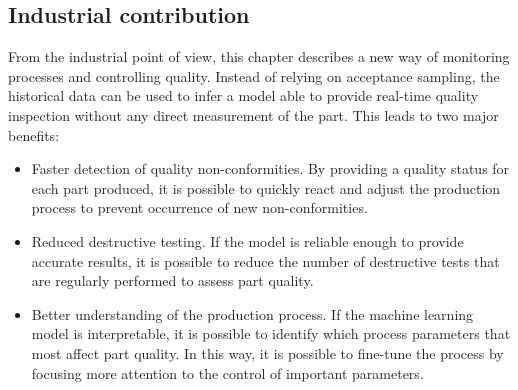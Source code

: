 \subsection{Industrial contribution}

From the industrial point of view, this chapter describes a new way of monitoring processes and controlling quality. Instead of relying on acceptance sampling, the historical data can be used to infer a model able to provide real-time quality inspection without any direct measurement of the part. This leads to two major benefits:

\begin{itemize}
    \item Faster detection of quality non-conformities. By providing a quality status for each part produced, it is possible to quickly react and adjust the production process to prevent occurrence of new non-conformities.
    \item Reduced destructive testing. If the model is reliable enough to provide accurate results, it is possible to reduce the number of destructive tests that are regularly performed to assess part quality.
    \item Better understanding of the production process. If the machine learning model is interpretable, it is possible to identify which process parameters that most affect part quality. In this way, it is possible to fine-tune the process by focusing more attention to the control of important parameters. 
\end{itemize}

\cleardoublepage